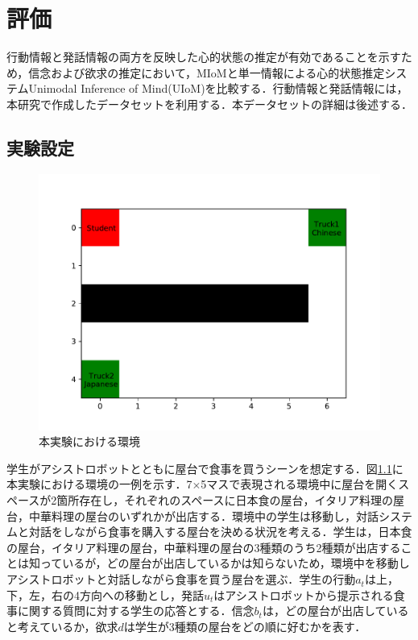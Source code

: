 \chapter{評価}
\par
行動情報と発話情報の両方を反映した心的状態の推定が有効であることを示すため，信念および欲求の推定において，MIoMと単一情報による心的状態推定システムUnimodal Inference of Mind(UIoM)を比較する．行動情報と発話情報には，本研究で作成したデータセットを利用する．本データセットの詳細は後述する．

\section{実験設定}

\begin{figure}[htbp]
  \begin{center}
    \includegraphics[]{./figure.pdf}
    \caption{本実験における環境}
    \label{fig:ex_env}
  \end{center}
\end{figure}

\par
学生がアシストロボットとともに屋台で食事を買うシーンを想定する．図\ref{fig:ex_env}に本実験における環境の一例を示す．7$\times$5マスで表現される環境中に屋台を開くスペースが2箇所存在し，それぞれのスペースに日本食の屋台，イタリア料理の屋台，中華料理の屋台のいずれかが出店する．環境中の学生は移動し，対話システムと対話をしながら食事を購入する屋台を決める状況を考える．学生は，日本食の屋台，イタリア料理の屋台，中華料理の屋台の3種類のうち2種類が出店することは知っているが，どの屋台が出店しているかは知らないため，環境中を移動しアシストロボットと対話しながら食事を買う屋台を選ぶ．学生の行動$a_t$は上，下，左，右の4方向への移動とし，発話$u_t$はアシストロボットから提示される食事に関する質問に対する学生の応答とする．信念$b_t$は，どの屋台が出店していると考えているか，欲求$d$は学生が3種類の屋台をどの順に好むかを表す．


